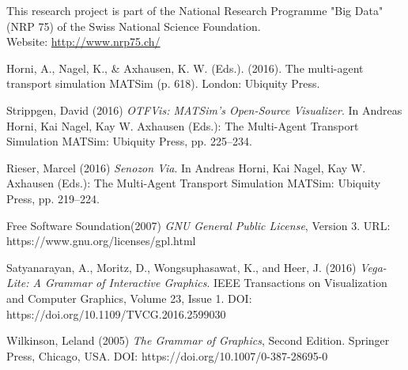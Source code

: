 \documentclass[Afour,sagev,times]{sagej}
\begin{document}
\begin{acks}
This research project is part of the National Research Programme "Big Data" (NRP 75) of the Swiss National Science Foundation.\\
Website: \url{http://www.nrp75.ch/}
\end{acks}

\begin{thebibliography}{99}

Horni, A., Nagel, K., \& Axhausen, K. W. (Eds.). (2016). The multi-agent transport simulation MATSim (p. 618). London: Ubiquity Press.

Strippgen, David (2016) \textit{OTFVis: MATSim’s Open-Source Visualizer}. In Andreas Horni, Kai Nagel, Kay W. Axhausen (Eds.): The Multi-Agent Transport Simulation MATSim: Ubiquity Press, pp. 225–234.

Rieser, Marcel (2016) \textit{Senozon Via}. In Andreas Horni, Kai Nagel, Kay W. Axhausen (Eds.): The Multi-Agent Transport Simulation MATSim: Ubiquity Press, pp. 219–224.

Free Software Soundation(2007) \textit{GNU General Public License}, Version 3.
URL: https://www.gnu.org/licenses/gpl.html

Satyanarayan, A., Moritz, D., Wongsuphasawat, K., and Heer, J. (2016) \textit{Vega-Lite: A Grammar of Interactive Graphics}. IEEE Transactions on Visualization and Computer Graphics, Volume 23, Issue 1. DOI: https://doi.org/10.1109/TVCG.2016.2599030

Wilkinson, Leland (2005) \textit{The Grammar of Graphics}, Second Edition. Springer Press, Chicago, USA. DOI: https://doi.org/10.1007/0-387-28695-0

\end{thebibliography}
\end{document}
